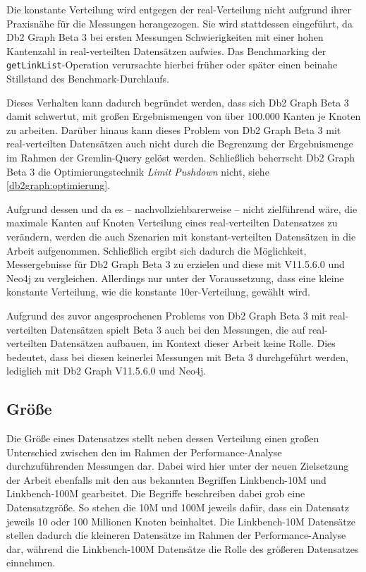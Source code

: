 Die konstante Verteilung wird entgegen der real-Verteilung nicht aufgrund ihrer Praxisnähe für die Messungen herangezogen. Sie wird stattdessen eingeführt, da Db2 Graph Beta 3 bei ersten Messungen Schwierigkeiten mit einer hohen Kantenzahl in real-verteilten Datensätzen aufwies. Das Benchmarking der \texttt{getLinkList}-Operation verursachte hierbei früher oder später einen beinahe Stillstand des Benchmark-Durchlaufs. 

Dieses Verhalten kann dadurch begründet werden, dass sich Db2 Graph Beta 3 damit schwertut, mit großen Ergebnismengen von über 100.000 Kanten je Knoten zu arbeiten. Darüber hinaus kann dieses Problem von Db2 Graph Beta 3 mit real-verteilten Datensätzen auch nicht durch die Begrenzung der Ergebnismenge im Rahmen der Gremlin-Query gelöst werden. Schließlich beherrscht Db2 Graph Beta 3 die Optimierungstechnik \textit{Limit Pushdown} nicht, siehe \autoref{db2graph:optimierung}. 

Aufgrund dessen und da es -- nachvollziehbarerweise -- nicht zielführend wäre, die maximale Kanten auf Knoten Verteilung eines real-verteilten Datensatzes zu verändern, werden die auch Szenarien mit konstant-verteilten Datensätzen in die Arbeit aufgenommen. Schließlich ergibt sich dadurch die Möglichkeit, Messergebnisse für Db2 Graph Beta 3 zu erzielen und diese mit V11.5.6.0 und Neo4j zu vergleichen. Allerdings nur unter der Voraussetzung, dass eine kleine konstante Verteilung, wie die konstante 10er-Verteilung, gewählt wird. 

Aufgrund des zuvor angesprochenen Problems von Db2 Graph Beta 3 mit real-verteilten Datensätzen spielt Beta 3 auch bei den Messungen, die auf real-verteilten Datensätzen aufbauen, im Kontext dieser Arbeit keine Rolle. Dies bedeutet, dass bei diesen keinerlei Messungen mit Beta 3 durchgeführt werden, lediglich mit Db2 Graph V11.5.6.0 und Neo4j. 

\subsection{Größe}
Die Größe eines Datensatzes stellt neben dessen Verteilung einen großen Unterschied zwischen den im Rahmen der Performance-Analyse durchzuführenden Messungen dar. Dabei wird hier unter der neuen Zielsetzung der Arbeit ebenfalls mit den aus \cite{sigmod_tian} bekannten Begriffen Linkbench-10M und Linkbench-100M gearbeitet. Die Begriffe beschreiben dabei grob eine Datensatzgröße. So stehen die 10M und 100M jeweils dafür, dass ein Datensatz jeweils 10 oder 100 Millionen Knoten beinhaltet. Die Linkbench-10M Datensätze stellen dadurch die kleineren Datensätze im Rahmen der Performance-Analyse dar, während die Linkbench-100M Datensätze die Rolle des größeren Datensatzes einnehmen. 

